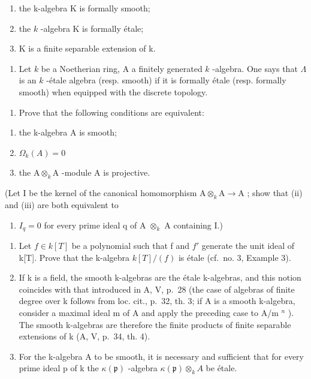 \begin{enumerate}
\def\labelenumi{(\roman{enumi})}
\item
  the k-algebra K is formally smooth;
\item
  the \(k\) -algebra K is formally étale;
\item
  K is a finite separable extension of k.
\end{enumerate}

\begin{enumerate}
\def\labelenumi{\arabic{enumi})}
\setcounter{enumi}{3}
\tightlist
\item
  Let \(k\) be a Noetherian ring, A a finitely generated \(k\) -algebra. One says that \(\Lambda\) is an \(k\) -étale algebra (resp. smooth) if it is formally étale (resp. formally smooth) when equipped with the discrete topology.
\end{enumerate}

\begin{enumerate}
\def\labelenumi{\alph{enumi})}
\tightlist
\item
  Prove that the following conditions are equivalent:
\end{enumerate}

\begin{enumerate}
\def\labelenumi{(\roman{enumi})}
\item
  the k-algebra A is smooth;
\item
  \(\Omega_k(A) = 0\)
\item
  the \(\mathrm{A}\otimes_{k}\mathrm{A}\) -module A is projective.
\end{enumerate}

(Let I be the kernel of the canonical homomorphism \(\mathrm{A} \otimes_k \mathrm{A} \to \mathrm{A}\) ; show that (ii) and (iii) are both equivalent to

\begin{enumerate}
\def\labelenumi{(\roman{enumi})}
\setcounter{enumi}{3}
\tightlist
\item
  \(I_{q} = 0\) for every prime ideal q of A \(\otimes_{k}\) A containing I.)
\end{enumerate}

\begin{enumerate}
\def\labelenumi{\alph{enumi})}
\setcounter{enumi}{1}
\item
  Let \(f \in k[T]\) be a polynomial such that f and \(f'\) generate the unit ideal of k{[}T{]}. Prove that the k-algebra \(k[T]/(f)\) is étale (cf.~no. 3, Example 3).
\item
  If k is a field, the smooth k-algebras are the étale k-algebras, and this notion coincides with that introduced in A, V, p.~28 (the case of algebras of finite degree over k follows from loc. cit., p.~32, th. 3; if A is a smooth k-algebra, consider a maximal ideal m of A and apply the preceding case to A/m \(^{n}\) ). The smooth k-algebras are therefore the finite products of finite separable extensions of k (A, V, p.~34, th. 4).
\item
  For the k-algebra A to be smooth, it is necessary and sufficient that for every prime ideal p of k the \(\kappa(\mathfrak{p})\) -algebra \(\kappa(\mathfrak{p})\otimes_{k}A\) be étale.
\end{enumerate}

